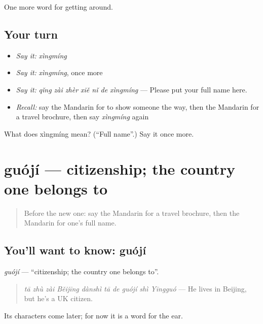 \begin{grammarlens}[title={What you've built}]
One more word for getting around.
\end{grammarlens}

\subsection*{Your turn}
\begin{itemize}
\raggedright
  \item \emph{Say it:} \emph{xìngmíng}
  \item \emph{Say it:} \emph{xìngmíng}, once more
  \item \emph{Say it:} \emph{qǐng zài zhèr xiě nǐ de xìngmíng} — Please put your full name here.
  \item \emph{Recall:} say the Mandarin for to show someone the way, then the Mandarin for a travel brochure, then say \emph{xìngmíng} again
\end{itemize}

\begin{tcolorbox}[breakable,colback=teal!4,colframe=teal!35!black,title={Before you move on}]
What does xìngmíng mean? (\textquotedblleft{}Full name\textquotedblright{}.) Say it once more.
\end{tcolorbox}
\section[guójí]{guójí — citizenship; the country one belongs to}

\label{lesson:ZH-C455-guoji}



\begin{quote}
Before the new one: say the Mandarin for a travel brochure, then the Mandarin for one's full name.
\end{quote}

\subsection*{You'll want to know: guójí}
\emph{guójí} — \textquotedblleft{}citizenship; the country one belongs to\textquotedblright{}.

\begin{quote}
\emph{tā zhù zài Běijīng dànshì tā de guójí shì Yīngguó} — He lives in Beijing, but he's a UK citizen.
\end{quote}

Its characters come later; for now it is a word for the ear.

